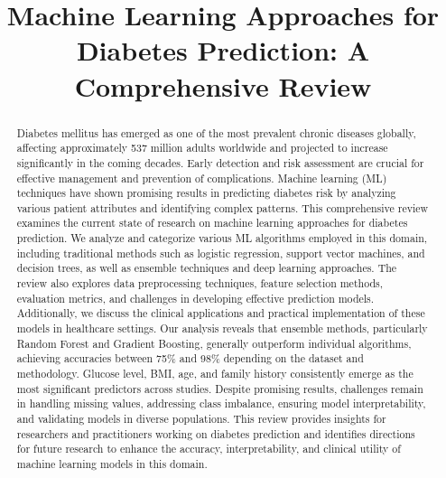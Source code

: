 \documentclass[journal]{IEEEtran}
\begin{document}
\title{Machine Learning Approaches for Diabetes Prediction: A Comprehensive Review}

\author{
\and
{}
\and
{}
}

\maketitle

\begin{abstract}
Diabetes mellitus has emerged as one of the most prevalent chronic diseases globally, affecting approximately 537 million adults worldwide and projected to increase significantly in the coming decades. Early detection and risk assessment are crucial for effective management and prevention of complications. Machine learning (ML) techniques have shown promising results in predicting diabetes risk by analyzing various patient attributes and identifying complex patterns. This comprehensive review examines the current state of research on machine learning approaches for diabetes prediction. We analyze and categorize various ML algorithms employed in this domain, including traditional methods such as logistic regression, support vector machines, and decision trees, as well as ensemble techniques and deep learning approaches. The review also explores data preprocessing techniques, feature selection methods, evaluation metrics, and challenges in developing effective prediction models. Additionally, we discuss the clinical applications and practical implementation of these models in healthcare settings. Our analysis reveals that ensemble methods, particularly Random Forest and Gradient Boosting, generally outperform individual algorithms, achieving accuracies between 75\% and 98\% depending on the dataset and methodology. Glucose level, BMI, age, and family history consistently emerge as the most significant predictors across studies. Despite promising results, challenges remain in handling missing values, addressing class imbalance, ensuring model interpretability, and validating models in diverse populations. This review provides insights for researchers and practitioners working on diabetes prediction and identifies directions for future research to enhance the accuracy, interpretability, and clinical utility of machine learning models in this domain.
\end{abstract}
\end{document}
